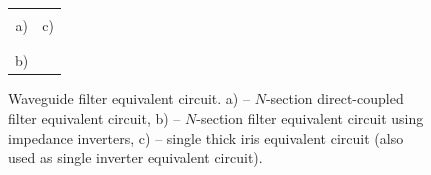 \documentclass{pj}
\begin{document}
\begin{figure}[h]
  \begin{tabular}{cc}
     & 
    \\
    a) & c) \\
    & \\
     & \\
    b) & \\
  \end{tabular}
  
  \caption{Waveguide filter equivalent circuit.  a) -- $N$-section
    direct-coupled filter equivalent circuit, b) -- $N$-section filter
    equivalent circuit using impedance inverters, c) -- single thick
    iris equivalent circuit (also used as single inverter equivalent circuit).}
  \label{fig:circuit:1}
\end{figure}
\end{document}

